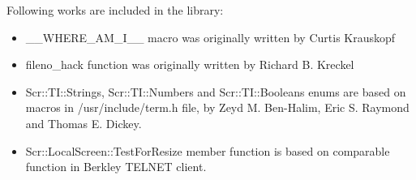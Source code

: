 Following works are included in the library:
\begin{itemize}
\item \_\_WHERE\_AM\_I\_\_ macro was originally written by  Curtis Krauskopf
\item fileno\_hack function was originally written by Richard B. Kreckel
\item Scr::TI::Strings, Scr::TI::Numbers and Scr::TI::Booleans enums
  are  based on macros in  /usr/include/term.h file, by Zeyd M. Ben-Halim, Eric
 S. Raymond and Thomas E. Dickey.
\item Scr::LocalScreen::TestForResize member function is based on
  comparable function in Berkley TELNET client.
\end{itemize}
